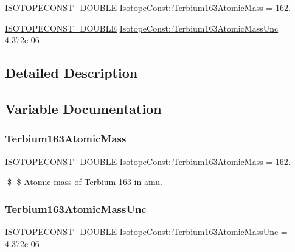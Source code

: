 \begin{DoxyCompactItemize}
\item 
\mbox{\hyperlink{group___isotope_const-_macros_ga8f45a7272ce02c0b4c65c44636ed719a}{I\+S\+O\+T\+O\+P\+E\+C\+O\+N\+S\+T\+\_\+\+D\+O\+U\+B\+LE}} \mbox{\hyperlink{group___isotope_const-_terbium-_tb163_ga24b3b50c8a2d1ba578240dd2b44e72c6}{Isotope\+Const\+::\+Terbium163\+Atomic\+Mass}} = 162.
\item 
\mbox{\hyperlink{group___isotope_const-_macros_ga8f45a7272ce02c0b4c65c44636ed719a}{I\+S\+O\+T\+O\+P\+E\+C\+O\+N\+S\+T\+\_\+\+D\+O\+U\+B\+LE}} \mbox{\hyperlink{group___isotope_const-_terbium-_tb163_ga82536984e105915244ebcb03083e9edc}{Isotope\+Const\+::\+Terbium163\+Atomic\+Mass\+Unc}} = 4.\+372e-\/06
\end{DoxyCompactItemize}


\subsection{Detailed Description}


\subsection{Variable Documentation}
\mbox{\label{group___isotope_const-_terbium-_tb163_ga24b3b50c8a2d1ba578240dd2b44e72c6}} 
\subsubsection{\texorpdfstring{Terbium163\+Atomic\+Mass}{Terbium163AtomicMass}}
{\footnotesize\ttfamily \mbox{\hyperlink{group___isotope_const-_macros_ga8f45a7272ce02c0b4c65c44636ed719a}{I\+S\+O\+T\+O\+P\+E\+C\+O\+N\+S\+T\+\_\+\+D\+O\+U\+B\+LE}} Isotope\+Const\+::\+Terbium163\+Atomic\+Mass = 162.}

\$ \$ Atomic mass of Terbium-\/163 in amu. \mbox{\label{group___isotope_const-_terbium-_tb163_ga82536984e105915244ebcb03083e9edc}} 
\subsubsection{\texorpdfstring{Terbium163\+Atomic\+Mass\+Unc}{Terbium163AtomicMassUnc}}
{\footnotesize\ttfamily \mbox{\hyperlink{group___isotope_const-_macros_ga8f45a7272ce02c0b4c65c44636ed719a}{I\+S\+O\+T\+O\+P\+E\+C\+O\+N\+S\+T\+\_\+\+D\+O\+U\+B\+LE}} Isotope\+Const\+::\+Terbium163\+Atomic\+Mass\+Unc = 4.\+372e-\/06}

